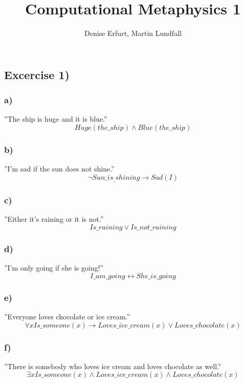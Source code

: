 \documentclass[12pt]{article}
\begin{document}
\title{Computational Metaphysics 1}
\author{Denise Erfurt, Martin Lundfall}
\maketitle





\subsection*{Excercise 1)}
\subsubsection*{a)}
”The ship is huge and it is blue.”
\begin{equation}
  Huge(the\_ship) \land Blue(the\_ship)
\end{equation}
\subsubsection*{b)}
”I’m sad if the sun does not shine.”
\begin{equation}
  \neg Sun\_is_\_shining \rightarrow Sad(I)
\end{equation}
\subsubsection*{c)}
”Either it’s raining or it is not.”
\begin{equation}
  Is\_raining \lor Is\_not\_raining
\end{equation}
\subsubsection*{d)}
”I’m only going if she is going!”
\begin{equation}
  I\_am\_going \leftrightarrow She\_is\_going
\end{equation}
\subsubsection*{e)}
”Everyone loves chocolate or ice cream.”
\begin{equation}
  \forall x Is\_someone(x) \rightarrow  Loves\_ice\_cream(x) \lor Loves\_chocolate(x)
\end{equation}
\subsubsection*{f)}
”There is somebody who loves ice cream and loves chocolate as well.”
\begin{equation}
  \exists x Is\_someone(x) \land Loves\_ice\_cream(x) \land Loves\_chocolate(x)
\end{equation}
\end{document}
